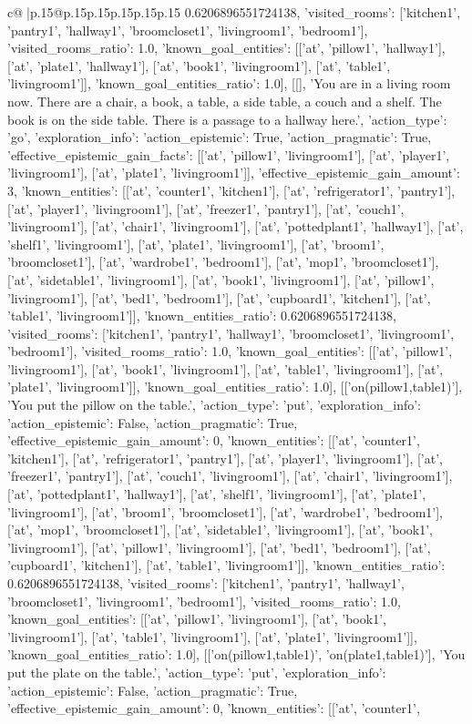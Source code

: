 \documentclass{article}
\begin{document}
{\begin{supertabular}{c@{$\;$}|p{.15\linewidth}@{}p{.15\linewidth}p{.15\linewidth}p{.15\linewidth}p{.15\linewidth}p{.15\linewidth}}
{{{0.6206896551724138, 'visited_rooms': ['kitchen1', 'pantry1', 'hallway1', 'broomcloset1', 'livingroom1', 'bedroom1'], 'visited_rooms_ratio': 1.0, 'known_goal_entities': [['at', 'pillow1', 'hallway1'], ['at', 'plate1', 'hallway1'], ['at', 'book1', 'livingroom1'], ['at', 'table1', 'livingroom1']], 'known_goal_entities_ratio': 1.0}}], [[], 'You are in a living room now. There are a chair, a book, a table, a side table, a couch and a shelf. The book is on the side table. There is a passage to a hallway here.', {'action_type': 'go', 'exploration_info': {'action_epistemic': True, 'action_pragmatic': True, 'effective_epistemic_gain_facts': [['at', 'pillow1', 'livingroom1'], ['at', 'player1', 'livingroom1'], ['at', 'plate1', 'livingroom1']], 'effective_epistemic_gain_amount': 3, 'known_entities': [['at', 'counter1', 'kitchen1'], ['at', 'refrigerator1', 'pantry1'], ['at', 'player1', 'livingroom1'], ['at', 'freezer1', 'pantry1'], ['at', 'couch1', 'livingroom1'], ['at', 'chair1', 'livingroom1'], ['at', 'pottedplant1', 'hallway1'], ['at', 'shelf1', 'livingroom1'], ['at', 'plate1', 'livingroom1'], ['at', 'broom1', 'broomcloset1'], ['at', 'wardrobe1', 'bedroom1'], ['at', 'mop1', 'broomcloset1'], ['at', 'sidetable1', 'livingroom1'], ['at', 'book1', 'livingroom1'], ['at', 'pillow1', 'livingroom1'], ['at', 'bed1', 'bedroom1'], ['at', 'cupboard1', 'kitchen1'], ['at', 'table1', 'livingroom1']], 'known_entities_ratio': 0.6206896551724138, 'visited_rooms': ['kitchen1', 'pantry1', 'hallway1', 'broomcloset1', 'livingroom1', 'bedroom1'], 'visited_rooms_ratio': 1.0, 'known_goal_entities': [['at', 'pillow1', 'livingroom1'], ['at', 'book1', 'livingroom1'], ['at', 'table1', 'livingroom1'], ['at', 'plate1', 'livingroom1']], 'known_goal_entities_ratio': 1.0}}], [['on(pillow1,table1)'], 'You put the pillow on the table.', {'action_type': 'put', 'exploration_info': {'action_epistemic': False, 'action_pragmatic': True, 'effective_epistemic_gain_amount': 0, 'known_entities': [['at', 'counter1', 'kitchen1'], ['at', 'refrigerator1', 'pantry1'], ['at', 'player1', 'livingroom1'], ['at', 'freezer1', 'pantry1'], ['at', 'couch1', 'livingroom1'], ['at', 'chair1', 'livingroom1'], ['at', 'pottedplant1', 'hallway1'], ['at', 'shelf1', 'livingroom1'], ['at', 'plate1', 'livingroom1'], ['at', 'broom1', 'broomcloset1'], ['at', 'wardrobe1', 'bedroom1'], ['at', 'mop1', 'broomcloset1'], ['at', 'sidetable1', 'livingroom1'], ['at', 'book1', 'livingroom1'], ['at', 'pillow1', 'livingroom1'], ['at', 'bed1', 'bedroom1'], ['at', 'cupboard1', 'kitchen1'], ['at', 'table1', 'livingroom1']], 'known_entities_ratio': 0.6206896551724138, 'visited_rooms': ['kitchen1', 'pantry1', 'hallway1', 'broomcloset1', 'livingroom1', 'bedroom1'], 'visited_rooms_ratio': 1.0, 'known_goal_entities': [['at', 'pillow1', 'livingroom1'], ['at', 'book1', 'livingroom1'], ['at', 'table1', 'livingroom1'], ['at', 'plate1', 'livingroom1']], 'known_goal_entities_ratio': 1.0}}], [['on(pillow1,table1)', 'on(plate1,table1)'], 'You put the plate on the table.', {'action_type': 'put', 'exploration_info': {'action_epistemic': False, 'action_pragmatic': True, 'effective_epistemic_gain_amount': 0, 'known_entities': [['at', 'counter1', }}}
\end{supertabular}}
\end{document}
